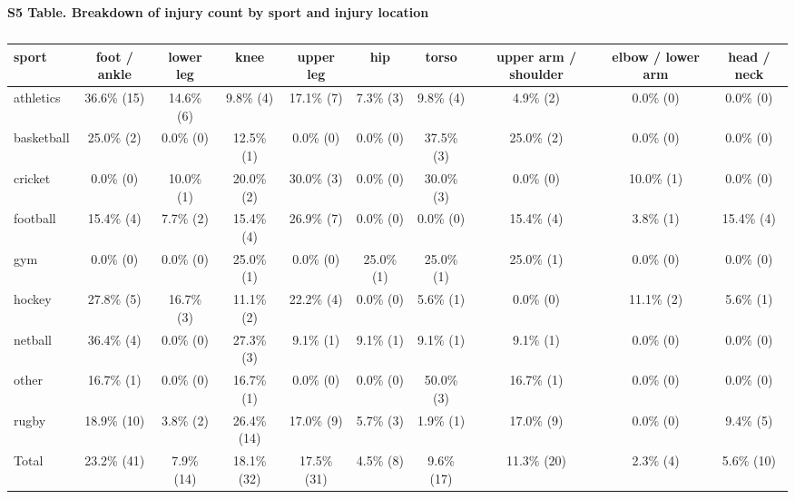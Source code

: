 \documentclass[
]{article}
\begin{document}
\newpage
\begin{landscape}

\textbf{S5 Table. Breakdown of injury count by sport and injury location}

\begin{table}[H]

\caption{\label{tab:unnamed-chunk-5}}
\centering
\begin{tabular}[t]{l|c|c|c|c|c|c|c|c|c}
\hline
sport & foot / ankle & lower leg & knee & upper leg & hip & torso & upper arm / shoulder & elbow / lower arm & head / neck\\
\hline
athletics & 36.6\% (15) & 14.6\%  (6) & 9.8\%  (4) & 17.1\%  (7) & 7.3\% (3) & 9.8\%  (4) & 4.9\%  (2) & 0.0\% (0) & 0.0\%  (0)\\
\hline
basketball & 25.0\%  (2) & 0.0\%  (0) & 12.5\%  (1) & 0.0\%  (0) & 0.0\% (0) & 37.5\%  (3) & 25.0\%  (2) & 0.0\% (0) & 0.0\%  (0)\\
\hline
cricket & 0.0\%  (0) & 10.0\%  (1) & 20.0\%  (2) & 30.0\%  (3) & 0.0\% (0) & 30.0\%  (3) & 0.0\%  (0) & 10.0\% (1) & 0.0\%  (0)\\
\hline
football & 15.4\%  (4) & 7.7\%  (2) & 15.4\%  (4) & 26.9\%  (7) & 0.0\% (0) & 0.0\%  (0) & 15.4\%  (4) & 3.8\% (1) & 15.4\%  (4)\\
\hline
gym & 0.0\%  (0) & 0.0\%  (0) & 25.0\%  (1) & 0.0\%  (0) & 25.0\% (1) & 25.0\%  (1) & 25.0\%  (1) & 0.0\% (0) & 0.0\%  (0)\\
\hline
hockey & 27.8\%  (5) & 16.7\%  (3) & 11.1\%  (2) & 22.2\%  (4) & 0.0\% (0) & 5.6\%  (1) & 0.0\%  (0) & 11.1\% (2) & 5.6\%  (1)\\
\hline
netball & 36.4\%  (4) & 0.0\%  (0) & 27.3\%  (3) & 9.1\%  (1) & 9.1\% (1) & 9.1\%  (1) & 9.1\%  (1) & 0.0\% (0) & 0.0\%  (0)\\
\hline
other & 16.7\%  (1) & 0.0\%  (0) & 16.7\%  (1) & 0.0\%  (0) & 0.0\% (0) & 50.0\%  (3) & 16.7\%  (1) & 0.0\% (0) & 0.0\%  (0)\\
\hline
rugby & 18.9\% (10) & 3.8\%  (2) & 26.4\% (14) & 17.0\%  (9) & 5.7\% (3) & 1.9\%  (1) & 17.0\%  (9) & 0.0\% (0) & 9.4\%  (5)\\
\hline
Total & 23.2\% (41) & 7.9\% (14) & 18.1\% (32) & 17.5\% (31) & 4.5\% (8) & 9.6\% (17) & 11.3\% (20) & 2.3\% (4) & 5.6\% (10)\\
\hline
\end{tabular}
\end{table}

\end{landscape}
\end{document}
